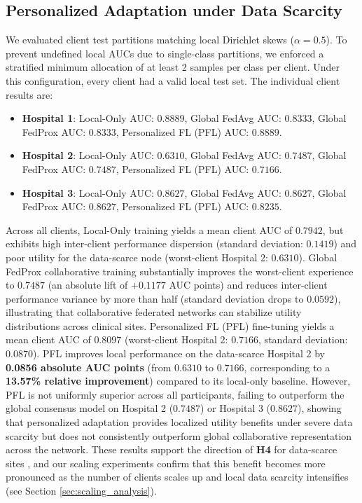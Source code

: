 \documentclass[conference]{IEEEtran}
\begin{document}
\subsection{Personalized Adaptation under Data Scarcity}
We evaluated client test partitions matching local Dirichlet skews ($\alpha=0.5$). To prevent undefined local AUCs due to single-class partitions, we enforced a stratified minimum allocation of at least 2 samples per class per client. Under this configuration, every client had a valid local test set. The individual client results are:
\begin{itemize}
    \item \textbf{Hospital 1}: Local-Only AUC: $0.8889$, Global FedAvg AUC: $0.8333$, Global FedProx AUC: $0.8333$, Personalized FL (PFL) AUC: $0.8889$.
    \item \textbf{Hospital 2}: Local-Only AUC: $0.6310$, Global FedAvg AUC: $0.7487$, Global FedProx AUC: $0.7487$, Personalized FL (PFL) AUC: $0.7166$.
    \item \textbf{Hospital 3}: Local-Only AUC: $0.8627$, Global FedAvg AUC: $0.8627$, Global FedProx AUC: $0.8627$, Personalized FL (PFL) AUC: $0.8235$.
\end{itemize}
Across all clients, Local-Only training yields a mean client AUC of $0.7942$, but exhibits high inter-client performance dispersion (standard deviation: $0.1419$) and poor utility for the data-scarce node (worst-client Hospital 2: $0.6310$). Global FedProx collaborative training substantially improves the worst-client experience to $0.7487$ (an absolute lift of $+0.1177$ AUC points) and reduces inter-client performance variance by more than half (standard deviation drops to $0.0592$), illustrating that collaborative federated networks can stabilize utility distributions across clinical sites. Personalized FL (PFL) fine-tuning \cite{Arivazhagan2019FederatedPersonalization, Li2021Ditto} yields a mean client AUC of $0.8097$ (worst-client Hospital 2: $0.7166$, standard deviation: $0.0870$). PFL improves local performance on the data-scarce Hospital 2 by \textbf{0.0856 absolute AUC points} (from $0.6310$ to $0.7166$, corresponding to a \textbf{13.57\% relative improvement}) compared to its local-only baseline. However, PFL is not uniformly superior across all participants, failing to outperform the global consensus model on Hospital 2 ($0.7487$) or Hospital 3 ($0.8627$), showing that personalized adaptation provides localized utility benefits under severe data scarcity but does not consistently outperform global collaborative representation across the network. These results support the direction of \textbf{H4} for data-scarce sites \cite{Kulkarni2020SurveyPFL}, and our scaling experiments confirm that this benefit becomes more pronounced as the number of clients scales up and local data scarcity intensifies (see Section \ref{sec:scaling_analysis}).
\end{document}
